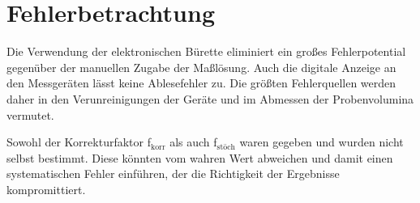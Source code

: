 \section{Fehlerbetrachtung}
\label{sec:fehler}

Die Verwendung der elektronischen Bürette eliminiert ein großes Fehlerpotential gegenüber der manuellen Zugabe der Maßlösung. Auch die digitale Anzeige an den Messgeräten lässt keine Ablesefehler zu. Die größten Fehlerquellen werden daher in den Verunreinigungen der Geräte und im Abmessen der Probenvolumina vermutet. 

Sowohl der Korrekturfaktor f$_{\text{korr}}$ als auch f$_{\text{stöch}}$ waren gegeben und wurden nicht selbst bestimmt. Diese könnten vom wahren Wert abweichen und damit einen systematischen Fehler einführen, der die Richtigkeit der Ergebnisse kompromittiert. 

